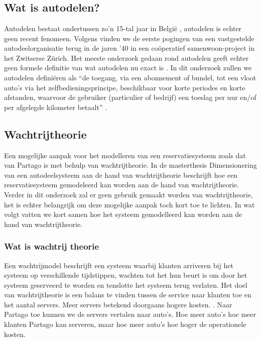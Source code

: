 \chapter{}
\label{ch:stand-van-zaken}



\section{Wat is autodelen?}
Autodelen bestaat ondertussen zo'n 15-tal jaar in België \autocite{ing}, autodelen is echter geen recent fenomeen. Volgens \textcite{millardball} vinden we de eerste pogingen van een vastgestelde autodeelorganisatie terug in de jaren '40 in een coöperatief samenwoon-project in het Zwitserse Zürich. Het meeste onderzoek gedaan rond autodelen geeft echter geen formele definitie van wat autodelen nu exact is \autocite{millardball}. In dit onderzoek zullen we autodelen definiëren als ``de toegang, via een abonnement of bundel, tot een vloot auto's via het zelfbedieningsprincipe, beschikbaar voor korte periodes en korte afstanden, waarvoor de gebruiker (particulier of bedrijf) een toeslag per uur en/of per afgelegde kilometer betaalt'' \autocite{ing}.

\section{Wachtrijtheorie}
Een mogelijke aanpak voor het modelleren van een reservatiesysteem zoals dat van Partago is met behulp van wachtrijtheorie. In de masterthesis Dimensionering van een autodeelsysteem aan de hand van wachtrijtheorie beschrijft \textcite{van-buggenhout} hoe een reservatiesysteem gemodeleerd kan worden aan de hand van wachtrijtheorie. Verder in dit onderzoek zal er geen gebruik gemaakt worden van wachtrijtheorie, het is echter belangrijk om deze mogelijke aanpak toch kort toe te lichten. In wat volgt vatten we kort samen hoe het systeem gemodelleerd kan worden aan de hand van wachtrijtheorie.

\subsection{Wat is wachtrij theorie}
Een wachtrijmodel beschrijft een systeem waarbij klanten arriveren bij het systeem op verschillende tijdstippen, wachten tot het hun beurt is om door het systeem geserveerd te worden en tenslotte het systeem terug verlaten. Het doel van wachtrijtheorie is een balans te vinden tussen de service naar klanten toe en het aantal servers. Meer servers betekend doorgaans hogere kosten. \textcite{van-buggenhout}. Naar Partago toe kunnen we de servers vertalen naar auto's. Hoe meer auto's hoe meer klanten Partago kan serveren, maar hoe meer auto's hoe hoger de operationele kosten. 

